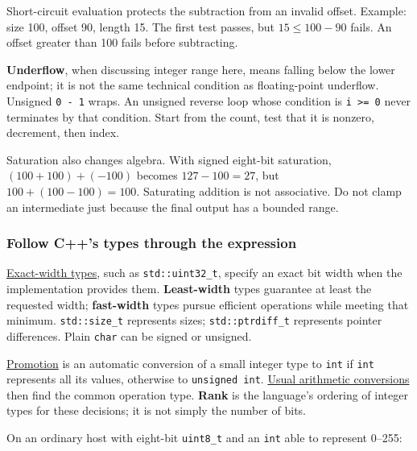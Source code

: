 Short-circuit evaluation protects the subtraction from an invalid offset. Example: size 100, offset 90, length 15. The first test passes, but \(15\le 100-90\) fails. An offset greater than 100 fails before subtracting.

\textbf{Underflow}, when discussing integer range here, means falling below the lower endpoint; it is not the same technical condition as floating-point underflow. Unsigned \texttt{0\ -\ 1} wraps. An unsigned reverse loop whose condition is \texttt{i\ \textgreater{}=\ 0} never terminates by that condition. Start from the count, test that it is nonzero, decrement, then index.

Saturation also changes algebra. With signed eight-bit saturation, \((100+100)+(-100)\) becomes \(127-100=27\), but \(100+(100-100)=100\). Saturating addition is not associative. Do not clamp an intermediate just because the final output has a bounded range.

\subsubsection{Follow C++'s types through the expression}\label{01-foundations-i-ch001-follow-cs-types-through-the-expression}

\hypertarget{01-foundations-i-ch001-follow-cs-types-through-the-expression}{}

\hyperref[appendix-cc04044b5782]{Exact-width types}, such as \texttt{std::uint32\_t}, specify an exact bit width when the implementation provides them. \textbf{Least-width} types guarantee at least the requested width; \textbf{fast-width} types pursue efficient operations while meeting that minimum. \texttt{std::size\_t} represents sizes; \texttt{std::ptrdiff\_t} represents pointer differences. Plain \texttt{char} can be signed or unsigned.

\hyperref[appendix-45303d03796a]{Promotion} is an automatic conversion of a small integer type to \texttt{int} if \texttt{int} represents all its values, otherwise to \texttt{unsigned\ int}. \hyperref[appendix-5e2d663adf7f]{Usual arithmetic conversions} then find the common operation type. \textbf{Rank} is the language's ordering of integer types for these decisions; it is not simply the number of bits.

On an ordinary host with eight-bit \texttt{uint8\_t} and an \texttt{int} able to represent 0--255:

